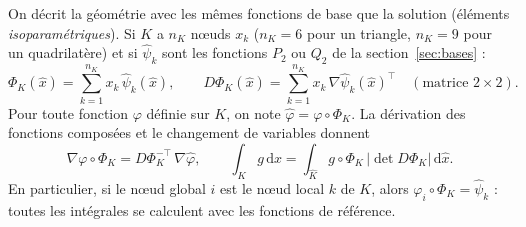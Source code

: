 \documentclass[11pt,a4paper]{article}
\begin{document}
\begin{center}
\end{center}

On décrit la géométrie avec les mêmes fonctions de base que la solution
(éléments \emph{isoparamétriques}). Si $K$ a $n_K$ nœuds $x_k$ ($n_K = 6$
pour un triangle, $n_K = 9$ pour un quadrilatère) et si $\widehat{\psi}_k$
sont les fonctions $P_2$ ou $Q_2$ de la section~\ref{sec:bases} :
\[
\Phi_K(\hat{x}) = \sum_{k=1}^{n_K} x_k\, \widehat{\psi}_k(\hat{x}),
\qquad
D\Phi_K(\hat{x}) = \sum_{k=1}^{n_K} x_k\, \nabla\widehat{\psi}_k(\hat{x})^{\top}
\quad (\text{matrice } 2 \times 2).
\]
Pour toute fonction $\varphi$ définie sur $K$, on note
$\widehat{\varphi} = \varphi \circ \Phi_K$. La dérivation des fonctions
composées et le changement de variables donnent
\[
\nabla \varphi \circ \Phi_K = D\Phi_K^{-\top}\, \nabla \widehat{\varphi},
\qquad
\int_K g \,\mathrm{d}x = \int_{\widehat{K}} g \circ \Phi_K\,
\left|\det D\Phi_K\right| \,\mathrm{d}\hat{x} .
\]
En particulier, si le nœud global $i$ est le nœud local $k$ de $K$, alors
$\varphi_i \circ \Phi_K = \widehat{\psi}_k$ : toutes les intégrales se calculent
avec les fonctions de référence.
\end{document}
